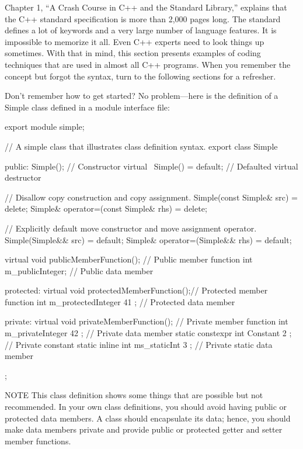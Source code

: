 
Chapter 1, “A Crash Course in C++ and the Standard Library,” explains that the C++ standard specification is more than 2,000 pages long. The standard defines a lot of keywords and a very large number of language features. It is impossible to memorize it all. Even C++ experts need to look things up sometimes. With that in mind, this section presents examples of coding techniques that are used in almost all C++ programs. When you remember the concept but forgot the syntax, turn to the following sections for a refresher.


Don’t remember how to get started? No problem—here is the definition of a Simple class defined in a module interface file:

\begin{cpp}
export module simple;

// A simple class that illustrates class definition syntax.
export class Simple
{
    public:
        Simple(); // Constructor
        virtual ~Simple() = default; // Defaulted virtual destructor

        // Disallow copy construction and copy assignment.
        Simple(const Simple& src) = delete;
        Simple& operator=(const Simple& rhs) = delete;

        // Explicitly default move constructor and move assignment operator.
        Simple(Simple&& src) = default;
        Simple& operator=(Simple&& rhs) = default;

        virtual void publicMemberFunction(); // Public member function
        int m_publicInteger; // Public data member

    protected:
        virtual void protectedMemberFunction();// Protected member function
        int m_protectedInteger { 41 }; // Protected data member

    private:
        virtual void privateMemberFunction(); // Private member function
        int m_privateInteger { 42 }; // Private data member
        static constexpr int Constant { 2 }; // Private constant
        static inline int ms_staticInt { 3 }; // Private static data member
};
\end{cpp}

\begin{myNotic}{NOTE}
This class definition shows some things that are possible but not recommended. In your own class definitions, you should avoid having public or protected data members. A class should encapsulate its data; hence, you should make data members private and provide public or protected getter and setter member functions.
\end{myNotic}

